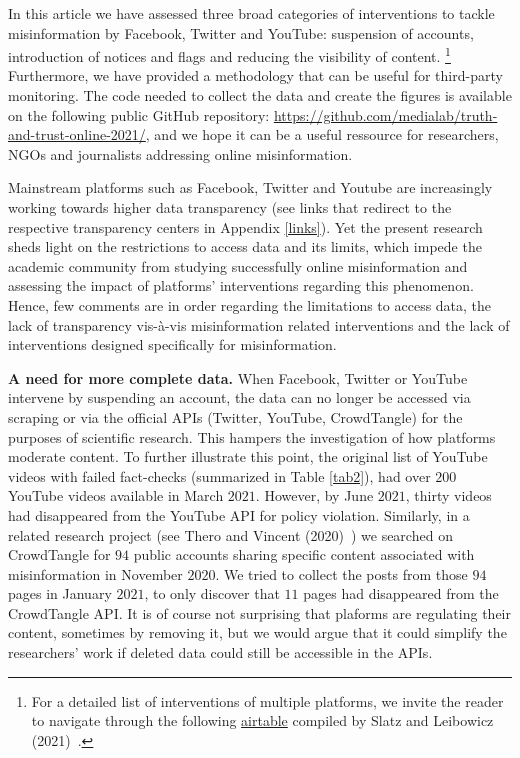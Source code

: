 \documentclass{article}
\begin{document}
In this article we have assessed three broad categories of interventions to tackle misinformation by Facebook, Twitter and YouTube: suspension of accounts, introduction of notices and flags and reducing the visibility of content.
\footnote{For a detailed list of interventions of multiple platforms, we invite the reader to navigate through the following \href{https://airtable.com/shrO0ooI9WSEfIUhb/tblAWQwFOiihKdQjm/viwZLAOzLK1NQ0c2n?blocks=hide}{airtable} compiled by Slatz and Leibowicz (2021)~\cite{niemanlab}.}
Furthermore, we have provided a methodology that can be useful for third-party monitoring. 
The code needed to collect the data and create the figures is available on the following public GitHub repository: \href{https://github.com/medialab/truth-and-trust-online-2021/}{https://github.com/medialab/truth-and-trust-online-2021/}, and we hope it can be a useful ressource for researchers, NGOs and journalists addressing online misinformation. 

\smallskip

Mainstream platforms such as Facebook, Twitter and Youtube are increasingly working towards higher data transparency (see links that redirect to the respective transparency centers in Appendix \ref{links}). 
Yet the present research sheds light on the restrictions to access data and its limits, which impede the academic community from studying successfully online misinformation and assessing the impact of platforms' interventions regarding this phenomenon. 
Hence, few comments are in order regarding the limitations to access data, the lack of transparency vis-\`{a}-vis misinformation related interventions and the lack of interventions designed specifically for misinformation. 

\smallskip

{\bf A need for more complete data.} When Facebook, Twitter or YouTube intervene by suspending an account, the data can no longer be accessed via scraping or via the official APIs (Twitter, YouTube, CrowdTangle) for the purposes of scientific research. 
This hampers the investigation of how platforms moderate content. 
To further illustrate this point, the original list of YouTube videos with failed fact-checks (summarized in Table \ref{tab2}), had over $200$ YouTube videos available in March $2021$. 
However, by June $2021$, thirty videos had disappeared from the YouTube API for policy violation. 
Similarly, in a related research project (see Thero and Vincent (2020)~\cite{therovincent}) we searched on CrowdTangle for $94$ public accounts sharing specific content associated with misinformation in November $2020$. 
We tried to collect the posts from those $94$ pages in January $2021$, to only discover that $11$ pages had disappeared from the CrowdTangle API.
It is of course not surprising that plaforms are regulating their content, sometimes by removing it, but we would argue that it could simplify the researchers' work if deleted data could still be accessible in the APIs.
\end{document}
